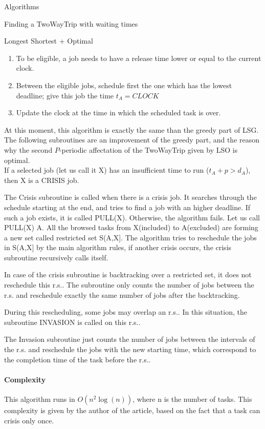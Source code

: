 \documentclass[a4paper,10pt]{report}
\begin{document}
\begin{chapter}{Algorithms}
\begin{section}{Finding a TwoWayTrip with waiting times}
\begin{subsection}{Longest Shortest + Optimal}
\begin{enumerate}
 \item To be eligible, a job needs to have a release time lower or equal to the current clock.
 \item Between the eligible jobs, schedule first the one which has the lowest deadline; give this job the time $t_A = CLOCK$
 \item Update the clock at the time in which the scheduled task is over.
\end{enumerate}
At this moment, this algorithm is exactly the same than the greedy part of LSG. The following subroutines are an improvement of the greedy part, and the reason why the second $P$-periodic affectation of the TwoWayTrip given by LSO is optimal.\\


If a selected job (let us call it X) has an insufficient time to run ($t_A + p > d_A$), then X is a CRISIS job.

The Crisis subroutine is called when there is a crisis job. It searches through the schedule starting at the end,
and tries to find a job with an higher deadline.
If such a job exists, it is called PULL(X). Otherwise, the algorithm fails.
Let us call PULL(X) A.
All the browsed tasks from X(included) to A(excluded) are forming a new set called restricted set S(A,X].
The algorithm tries to reschedule the jobs in S(A,X] by the main algorithm rules, if another crisis occurs, the crisis subroutine recursively calls
itself.

In case of the crisis subroutine is backtracking over a restricted set, it does not reschedule this r.s.. The subroutine only counts
the number of jobs between the r.s. and reschedule exactly the same number of jobs after the backtracking.

During this rescheduling, some jobs may overlap an r.s.. In this situation, the subroutine INVASION is called on this r.s..

The Invasion subroutine just counts the number of jobs between the intervals of the r.s. and reschedule the jobs with the new starting time,
which correspond to the completion time of the task before the r.s..



\paragraph{Complexity}
This algorithm runs in $O(n^2 \log(n))$, where n is the number of tasks. This complexity is given by the author of the article, based on the fact that a task can crisis only once.


\end{subsection}
\end{section}
\end{chapter}
\end{document}

